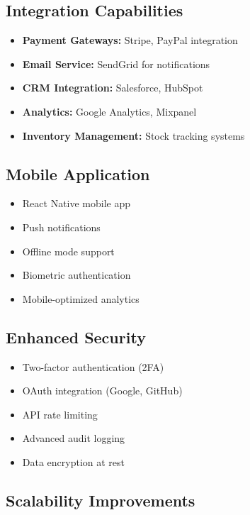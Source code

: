 \documentclass[12pt,a4paper]{article}
\begin{document}
\subsection{Integration Capabilities}

\begin{itemize}[leftmargin=*]
    \item \textbf{Payment Gateways:} Stripe, PayPal integration
    \item \textbf{Email Service:} SendGrid for notifications
    \item \textbf{CRM Integration:} Salesforce, HubSpot
    \item \textbf{Analytics:} Google Analytics, Mixpanel
    \item \textbf{Inventory Management:} Stock tracking systems
\end{itemize}

\subsection{Mobile Application}

\begin{itemize}[leftmargin=*]
    \item React Native mobile app
    \item Push notifications
    \item Offline mode support
    \item Biometric authentication
    \item Mobile-optimized analytics
\end{itemize}

\subsection{Enhanced Security}

\begin{itemize}[leftmargin=*]
    \item Two-factor authentication (2FA)
    \item OAuth integration (Google, GitHub)
    \item API rate limiting
    \item Advanced audit logging
    \item Data encryption at rest
\end{itemize}

\subsection{Scalability Improvements}
\end{document}
